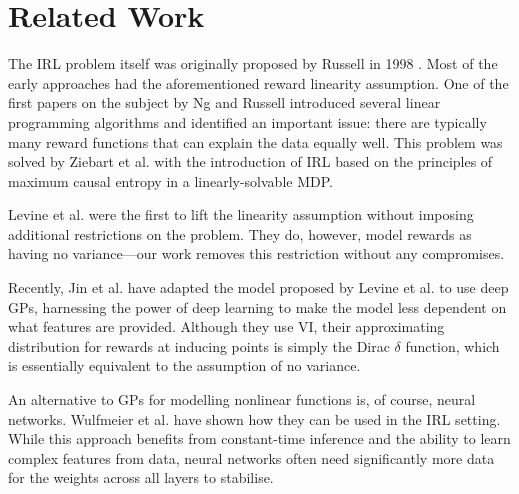 \documentclass{mpaper}
\begin{document}


\section{Related Work} %

The IRL problem itself was originally proposed by Russell in 1998
\cite{DBLP:conf/colt/Russell98}. Most of the early approaches had the
aforementioned reward linearity assumption. One of the first papers on the
subject by Ng and Russell \cite{DBLP:conf/icml/NgR00} introduced several linear
programming algorithms and identified an important issue: there are typically
many reward functions that can explain the data equally well. This problem was
solved by Ziebart et al. \cite{ziebart2008maximum} with the introduction of IRL
based on the principles of maximum causal entropy in a linearly-solvable MDP.

Levine et al. \cite{DBLP:conf/nips/LevinePK11} were the first to lift the
linearity assumption without imposing additional restrictions on the problem.
They do, however, model rewards as having no variance---our work removes this
restriction without any compromises.

Recently, Jin et al. \cite{DBLP:conf/uai/JinDAS17} have adapted the model
proposed by Levine et al. \cite{DBLP:conf/nips/LevinePK11} to use deep GPs,
harnessing the power of deep learning to make the model less dependent on what
features are provided. Although they use VI, their approximating distribution
for rewards at inducing points is simply the Dirac $\delta$ function, which is
essentially equivalent to the assumption of no variance.

An alternative to GPs for modelling nonlinear functions is, of course, neural
networks. Wulfmeier et al. \cite{wulfmeier2015maximum} have shown how they can
be used in the IRL setting. While this approach benefits from constant-time
inference and the ability to learn complex features from data, neural
networks often need significantly more data for the weights across all layers to
stabilise.
\end{document}
